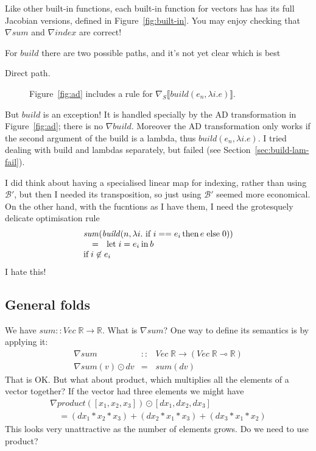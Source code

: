 \documentclass[sigplan,review]{acmart}
\renewcommand{\to}{\rightarrow}    %
\newcommand{\linto}{\multimap}     %
\newcommand{\grad}[1]{\nabla_S\lb #1 \rb}  %
\newcommand{\gradf}[1]{\nabla\! \mathit{#1}}  %
\newcommand{\lb}{\llbracket}
\newcommand{\rb}{\rrbracket}
\newcommand{\buildfun}{\mathit{build}}
\newcommand{\sumfunname}{\mathit{sum}}   %
\newcommand{\sumfun}[1]{\sumfunname(#1)}   %
\newcommand{\indexfunname}{\mathit{index}}
\renewcommand{\vector}[1]{\mathit{Vec}\;#1}
\newcommand{\real}{\mathbb{R}}       %
\newcommand{\lmapply}{\odot}   %
\newcommand{\lmcomp}{\,\circ\,}   %
\newcommand{\lmbuildt}{\mathcal B'}             %
\begin{document}
Like other built-in functions, each built-in function for vectors
has has its full Jacobian versions, defined in Figure~\ref{fig:built-in}.
You may enjoy checking that $\gradf{\sumfunname}$ and
$\gradf{\indexfunname}$ are correct! 

For $\buildfun$ there are two possible paths, and it's not yet clear
which is best
\begin{description}
\item[Direct path.]  Figure~\ref{fig:ad} includes a rule
  for $\grad{\buildfun(e_n, \lambda i.e)}$.
\end{description}
But $\buildfun$ is an exception!  It is handled specially
by the AD transformation in Figure~\ref{fig:ad}; there is no $\gradf{\buildfun}$.
Moreover the AD transformation only works if the second argument of the build is
a lambda, thus $\buildfun(e_n, \lambda i.e)$.  I tried dealing with build and
lambdas separately, but failed (see Section~\ref{sec:build-lam-fail}).

I did think about having a specialised linear map for indexing, rather
than using $\lmbuildt$, but then I needed its transposition, so just
using $\lmbuildt$ seemed more economical.  On the other hand, with the
fucntions as I have them, I need the grotesquely delicate optimisation
rule
$$
\begin{array}{l}
\sumfun{\buildfun( n, \lambda i.\, \mbox{\lstinline|if|} \, i == e_i \,
     \mbox{\lstinline|then|} \, e \,
     \mbox{\lstinline|else|} \, 0 )} \\
\quad = \;\; \mbox{\lstinline|let|}\, i = e_i \, \mbox{\lstinline|in|}\, b \\
\mbox{if} \; i \not\in e_i
\end{array}
$$
I hate this!

\subsection{General folds} \label{sec:gen-fold}

We have $\sumfunname :: \vector{\real} \to \real$.  What is $\gradf{\sumfunname}$?
One way to define its semantics is by applying it:
$$
\begin{array}{rcl}
  \gradf{\sumfunname} & :: & \vector{\real} \to (\vector{\real} \linto \real) \\
  \gradf{\sumfunname}(v) \lmapply dv & = & \sumfun{dv}
\end{array}
$$
That is OK.  But what about product, which multiplies all the elements
of a vector together? If the vector had three elements we might have
$$
\begin{array}{l}
  \gradf{product}([x_1,x_2,x_3]) \lmapply [dx_1, dx_2, dx_3] \\
  \quad = (dx_1 * x_2 * x_3) + (dx_2 * x_1 * x_3) + (dx_3 * x_1 * x_2)
\end{array}
$$
This looks very unattractive as the number of elements grows.  Do we need
to use product?
\end{document}
